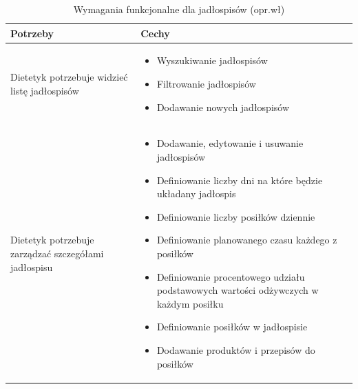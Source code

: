 \begin{minipage}{\textwidth}
    \begin{table}[H]
        \centering\caption{Wymagania funkcjonalne dla jadłospisów (opr.wł)\label{tabela:wymaganiaFunkcjonalneJadlospisy}}
        \begin{tabular}{|p{}|p{}|}
            \hline
            Potrzeby & Cechy \\

            \hline
            Dietetyk potrzebuje widzieć listę jadłospisów &
            \begin{itemize}
                \item Wyszukiwanie jadłospisów
                \item Filtrowanie jadłospisów
                \item Dodawanie nowych jadłospisów
            \end{itemize} \\
            \hline
            Dietetyk potrzebuje zarządzać szczegółami jadłospisu &
            \begin{itemize}
                \item Dodawanie, edytowanie i usuwanie jadłospisów
                \item Definiowanie liczby dni na które będzie układany jadłospis
                \item Definiowanie liczby posiłków dziennie
                \item Definiowanie planowanego czasu każdego z posiłków
                \item Definiowanie procentowego udziału podstawowych wartości odżywczych w każdym posiłku
                \item Definiowanie posiłków w jadłospisie
                \item Dodawanie produktów i przepisów do posiłków
            \end{itemize} \\
            \hline
        \end{tabular}
    \end{table}
\end{minipage}

